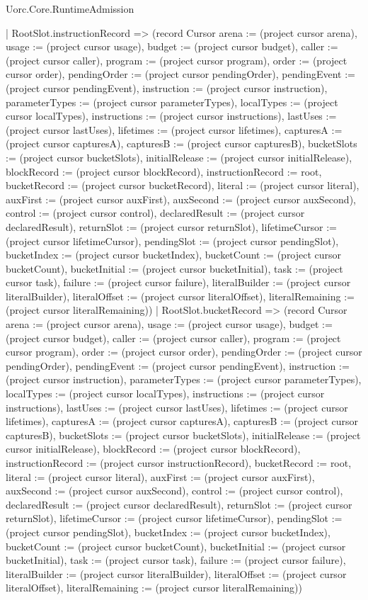 \begin{lexlean}{Uorc.Core.RuntimeAdmission}
\begin{semanticmodule}
{    | RootSlot.instructionRecord => (record Cursor {arena := (project cursor arena), usage := (project cursor usage), budget := (project cursor budget), caller := (project cursor caller), program := (project cursor program), order := (project cursor order), pendingOrder := (project cursor pendingOrder), pendingEvent := (project cursor pendingEvent), instruction := (project cursor instruction), parameterTypes := (project cursor parameterTypes), localTypes := (project cursor localTypes), instructions := (project cursor instructions), lastUses := (project cursor lastUses), lifetimes := (project cursor lifetimes), capturesA := (project cursor capturesA), capturesB := (project cursor capturesB), bucketSlots := (project cursor bucketSlots), initialRelease := (project cursor initialRelease), blockRecord := (project cursor blockRecord), instructionRecord := root, bucketRecord := (project cursor bucketRecord), literal := (project cursor literal), auxFirst := (project cursor auxFirst), auxSecond := (project cursor auxSecond), control := (project cursor control), declaredResult := (project cursor declaredResult), returnSlot := (project cursor returnSlot), lifetimeCursor := (project cursor lifetimeCursor), pendingSlot := (project cursor pendingSlot), bucketIndex := (project cursor bucketIndex), bucketCount := (project cursor bucketCount), bucketInitial := (project cursor bucketInitial), task := (project cursor task), failure := (project cursor failure), literalBuilder := (project cursor literalBuilder), literalOffset := (project cursor literalOffset), literalRemaining := (project cursor literalRemaining)})
    | RootSlot.bucketRecord => (record Cursor {arena := (project cursor arena), usage := (project cursor usage), budget := (project cursor budget), caller := (project cursor caller), program := (project cursor program), order := (project cursor order), pendingOrder := (project cursor pendingOrder), pendingEvent := (project cursor pendingEvent), instruction := (project cursor instruction), parameterTypes := (project cursor parameterTypes), localTypes := (project cursor localTypes), instructions := (project cursor instructions), lastUses := (project cursor lastUses), lifetimes := (project cursor lifetimes), capturesA := (project cursor capturesA), capturesB := (project cursor capturesB), bucketSlots := (project cursor bucketSlots), initialRelease := (project cursor initialRelease), blockRecord := (project cursor blockRecord), instructionRecord := (project cursor instructionRecord), bucketRecord := root, literal := (project cursor literal), auxFirst := (project cursor auxFirst), auxSecond := (project cursor auxSecond), control := (project cursor control), declaredResult := (project cursor declaredResult), returnSlot := (project cursor returnSlot), lifetimeCursor := (project cursor lifetimeCursor), pendingSlot := (project cursor pendingSlot), bucketIndex := (project cursor bucketIndex), bucketCount := (project cursor bucketCount), bucketInitial := (project cursor bucketInitial), task := (project cursor task), failure := (project cursor failure), literalBuilder := (project cursor literalBuilder), literalOffset := (project cursor literalOffset), literalRemaining := (project cursor literalRemaining)})
}
\end{semanticmodule}
\end{lexlean}
